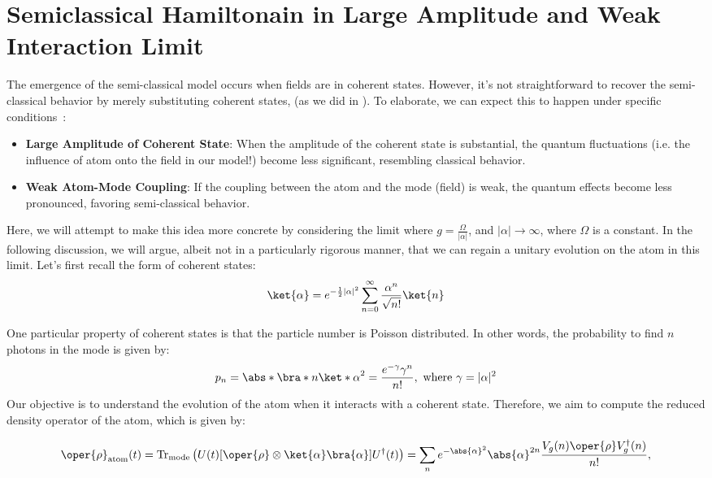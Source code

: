 \section*{Semiclassical Hamiltonain in Large Amplitude and Weak Interaction Limit}

The emergence of the semi-classical model occurs when fields are in 
coherent states. However, it's not straightforward to recover the 
semi-classical behavior by merely substituting coherent states, (as we did in ). 
To elaborate, we can expect this to happen under specific conditions~\cite{semiclassical_limit_JC_PRL}:
\begin{itemize}
    \item \textbf{Large Amplitude of Coherent State}: When the amplitude of the coherent state is substantial, 
    the quantum fluctuations (i.e. the influence of atom onto the field in our model!) become less significant, 
    resembling classical behavior.
    \item \textbf{Weak Atom-Mode Coupling}: If the coupling between the atom and the mode (field) is weak, 
    the quantum effects become less pronounced, favoring semi-classical behavior.
\end{itemize}
Here, we will attempt to make this idea more concrete by considering the 
limit where $g = \frac{\Omega}{|\alpha|}$, and $|\alpha| \rightarrow \infty$, where 
$\Omega$ is a constant. In the following discussion, we will argue, albeit not in a particularly rigorous manner, that we can regain a unitary evolution on the atom in this limit. Let's first recall the form of coherent states:
\begin{equation}
    \ket{\alpha} = e^{-\frac{1}{2}|\alpha|^2} \sum_{n=0}^{\infty} \frac{\alpha^n}{\sqrt{n!}} \ket{n}
\end{equation}
    
One particular property of coherent states is that the particle number is Poisson distributed. In other words, the probability to find $n$ photons in the mode is given by:
\begin{equation}
    p_n = \abs*{\bra*{n}\ket*{\alpha}}^2 = \frac{e^{-\gamma} \gamma^n}{n!}, \text{ where } \gamma = |\alpha|^2
\end{equation}
Our objective is to understand the evolution of the atom when it interacts with a coherent state. 
Therefore, we aim to compute the reduced density operator of the atom, which is given by:

\begin{equation}
\oper{\rho}_{\text{atom}}(t) = 
\text{Tr}_{\text{mode}} \left( U(t)[\oper{\rho} \otimes \ket{\alpha}\bra{\alpha}]U^\dagger(t) \right)
 = \sum_n e^{-\abs{\alpha}^2} \abs{\alpha}^{2n} \frac{V_g(n)\oper{\rho} V_g^\dagger(n)}{n!},
\end{equation}

